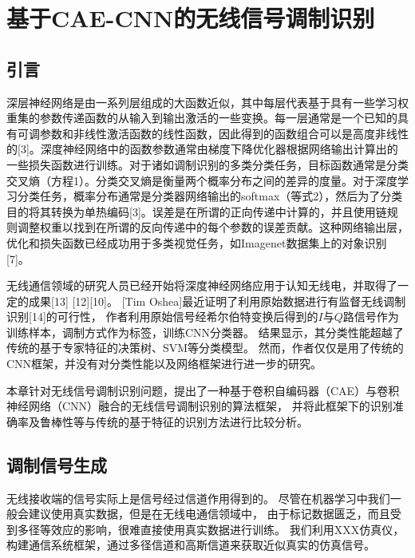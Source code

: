 \chapter{基于CAE-CNN的无线信号调制识别}

\section{引言}

深层神经网络是由一系列层组成的大函数近似，其中每层代表基于具有一些学习权重集的参数传递函数的从输入到输出激活的一些变换。每一层通常是一个已知的具有可调参数和非线性激活函数的线性函数，因此得到的函数组合可以是高度非线性的[3]。深度神经网络中的函数参数通常由梯度下降优化器根据网络输出计算出的一些损失函数进行训练。对于诸如调制识别的多类分类任务，目标函数通常是分类交叉熵（方程1）。分类交叉熵是衡量两个概率分布之间的差异的度量。对于深度学习分类任务，概率分布通常是分类器网络输出的softmax（等式2），然后为了分类目的将其转换为单热编码[3]。误差是在所谓的正向传递中计算的，并且使用链规则调整权重以找到在所谓的反向传递中的每个参数的误差贡献。这种网络输出层，优化和损失函数已经成功用于多类视觉任务，如Imagenet数据集上的对象识别[7]。\par

无线通信领域的研究人员已经开始将深度神经网络应用于认知无线电，并取得了一定的成果[13] [12][10]。
[Tim Oshea]最近证明了利用原始数据进行有监督无线调制识别[14]的可行性，
作者利用原始信号经希尔伯特变换后得到的$I$与$Q$路信号作为训练样本，调制方式作为标签，训练CNN分类器。
结果显示，其分类性能超越了传统的基于专家特征的决策树、SVM等分类模型。
然而，作者仅仅是用了传统的CNN框架，并没有对分类性能以及网络框架进行进一步的研究。\par

本章针对无线信号调制识别问题，提出了一种基于卷积自编码器（CAE）与卷积神经网络（CNN）融合的无线信号调制识别的算法框架，
并将此框架下的识别准确率及鲁棒性等与传统的基于特征的识别方法进行比较分析。\par


\section{调制信号生成}

无线接收端的信号实际上是信号经过信道作用得到的。
尽管在机器学习中我们一般会建议使用真实数据，但是在无线电通信领域中，
由于标记数据匮乏，而且受到多径等效应的影响，很难直接使用真实数据进行训练。
我们利用XXX仿真仪，构建通信系统框架，通过多径信道和高斯信道来获取近似真实的仿真信号。\par


